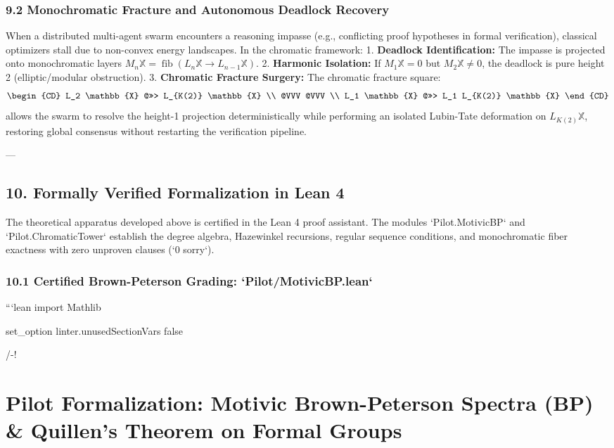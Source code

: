 \documentclass[11pt,twoside,openright]{amsbook}
\begin{document}
{{\subsection{9.2 Monochromatic Fracture and Autonomous Deadlock Recovery}
When a distributed multi-agent swarm encounters a reasoning impasse (e.g., conflicting proof hypotheses in formal verification), classical optimizers stall due to non-convex energy landscapes. In the chromatic framework:
1. \textbf{Deadlock Identification:} The impasse is projected onto monochromatic layers $M_n \mathbb{X} = \operatorname{fib}(L_n \mathbb{X} \to L_{n-1} \mathbb{X})$.
2. \textbf{Harmonic Isolation:} If $M_1 \mathbb{X} = 0$ but $M_2 \mathbb{X} \neq 0$, the deadlock is pure height 2 (elliptic/modular obstruction).
3. \textbf{Chromatic Fracture Surgery:} The chromatic fracture square:
   $$\begin{CD}
   L_2 \mathbb{X} @>>> L_{K(2)} \mathbb{X} \\
   @VVV @VVV \\
   L_1 \mathbb{X} @>>> L_1 L_{K(2)} \mathbb{X}
   \end{CD}$$
   allows the swarm to resolve the height-1 projection deterministically while performing an isolated Lubin-Tate deformation on $L_{K(2)} \mathbb{X}$, restoring global consensus without restarting the verification pipeline.

---

\section{10. Formally Verified Formalization in Lean 4}

The theoretical apparatus developed above is certified in the Lean 4 proof assistant. The modules `Pilot.MotivicBP` and `Pilot.ChromaticTower` establish the degree algebra, Hazewinkel recursions, regular sequence conditions, and monochromatic fiber exactness with zero unproven clauses (`0 sorry`).

\subsection{10.1 Certified Brown-Peterson Grading: `Pilot/MotivicBP.lean`}
```lean
import Mathlib

set_option linter.unusedSectionVars false

/-!
\chapter{Pilot Formalization: Motivic Brown-Peterson Spectra (BP) & Quillen's Theorem on Formal Groups}

}}
\end{document}
